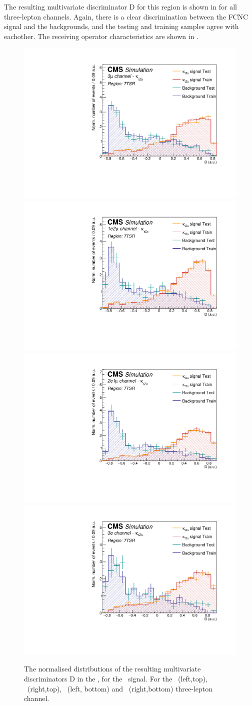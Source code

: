 \clearpage
The resulting multivariate discriminator D for this region is shown in  for all three-lepton channels. Again, there is a clear discrimination between the FCNC signal and the backgrounds, and the testing and training samples agree with eachother. The receiving operator characteristics are shown in . 
\begin{figure}[htbp]
	\centering
	\includegraphics[width=0.49\linewidth]{6_Search/Figures/PlotsTechnics/SigVsBkgTestZuttoppairuuu}
	\includegraphics[width=0.49\linewidth]{6_Search/Figures/PlotsTechnics/SigVsBkgTestZuttoppairuue}
	\includegraphics[width=0.49\linewidth]{6_Search/Figures/PlotsTechnics/SigVsBkgTestZuttoppaireeu}
	\includegraphics[width=0.49\linewidth]{6_Search/Figures/PlotsTechnics/SigVsBkgTestZuttoppaireee}
	\caption{The normalised distributions of the resulting  multivariate discriminators D in the \TTSR, for the \Zut\ signal. For the \mumumu\ (left,top), \emumu\ (right,top), \eemu\ (left, bottom) and \eee\ (right,bottom) three-lepton channel.}
	\label{fig:sigvsbkgtestzuttoppair}
\end{figure}


